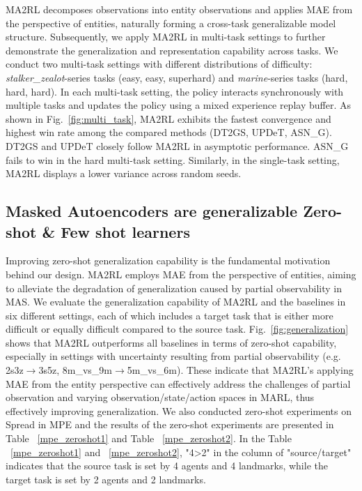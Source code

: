 MA2RL decomposes observations into entity observations and applies MAE from the perspective of entities, naturally forming a cross-task generalizable model structure. Subsequently, we apply MA2RL in multi-task settings to further demonstrate the generalization and representation capability across tasks. We conduct two multi-task settings with different distributions of difficulty: \textit{stalker\_zealot}-series tasks (easy, easy, superhard) and \textit{marine}-series tasks (hard, hard, hard). In each multi-task setting, the policy interacts synchronously with multiple tasks and updates the policy using a mixed experience replay buffer. As shown in Fig.~\ref{fig:multi_task}, MA2RL exhibits the fastest convergence and highest win rate among the compared methods (DT2GS, UPDeT, ASN\_G). DT2GS and UPDeT closely follow MA2RL in asymptotic performance. ASN\_G fails to win in the hard multi-task setting. Similarly, in the single-task setting, MA2RL displays a lower variance across random seeds.

\subsection{Masked Autoencoders are generalizable Zero-shot \& Few shot learners}
\label{subsec:generalization}
Improving zero-shot generalization capability is the fundamental motivation behind our design. MA2RL employs MAE from the perspective of entities, aiming to alleviate the degradation of generalization caused by partial observability in MAS. We evaluate the generalization capability of MA2RL and the baselines in six different settings, each of which includes a target task that is either more difficult or equally difficult compared to the source task. Fig.~\ref{fig:generalization} shows that MA2RL outperforms all baselines in terms of zero-shot capability, especially in settings with uncertainty resulting from partial observability (e.g. 2s3z$\rightarrow$3s5z, 8m\_vs\_9m$\rightarrow$5m\_vs\_6m). These indicate that MA2RL's applying MAE from the entity perspective can effectively address the challenges of partial observation and varying observation/state/action spaces in MARL, thus effectively improving generalization. We also conducted zero-shot experiments on Spread in MPE and the results of the zero-shot experiments are presented in Table ~\ref{mpe_zeroshot1} and Table ~\ref{mpe_zeroshot2}. In the Table ~\ref{mpe_zeroshot1} and ~\ref{mpe_zeroshot2}, "4>2" in the column of "source/target" indicates that the source task is set by 4 agents and 4 landmarks, while the target task is set by 2 agents and 2 landmarks.

